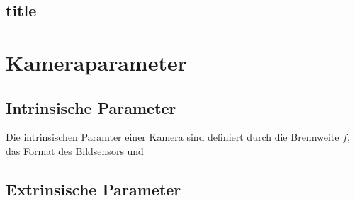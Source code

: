 	
	\subsection{title}
	
	
\section{Kameraparameter}
\subsection{Intrinsische Parameter}
Die intrinsischen Paramter einer Kamera sind definiert durch die Brennweite $f$, das Format des Bildsensors und 
\subsection{Extrinsische Parameter}
	